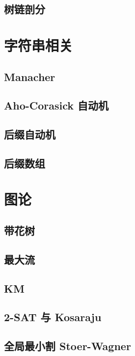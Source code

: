 \documentclass[10pt]{article}
\begin{document}
	\subsection{树链剖分}

\section{字符串相关}
	\subsection{Manacher}

	\subsection{Aho-Corasick 自动机}

	\subsection{后缀自动机}

	\subsection{后缀数组}

\section{图论}
	\subsection{带花树}

	\subsection{最大流}
	
	\subsection{KM}

	\subsection{2-SAT 与 Kosaraju}

	\subsection{全局最小割 Stoer-Wagner}
\end{document}
